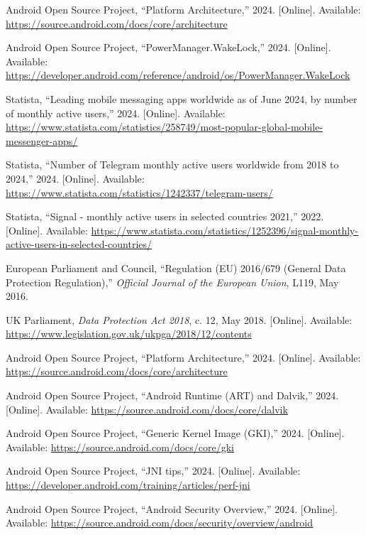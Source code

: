 \documentclass[a4paper,12pt]{report}
\begin{document}
\begin{thebibliography}{99}
Android Open Source Project, “Platform Architecture,” 2024. [Online]. Available: \url{https://source.android.com/docs/core/architecture}

Android Open Source Project, “PowerManager.WakeLock,” 2024. [Online]. Available: \url{https://developer.android.com/reference/android/os/PowerManager.WakeLock}

Statista, “Leading mobile messaging apps worldwide as of June 2024, by number of monthly active users,” 2024. [Online]. Available: \url{https://www.statista.com/statistics/258749/most-popular-global-mobile-messenger-apps/}

Statista, “Number of Telegram monthly active users worldwide from 2018 to 2024,” 2024. [Online]. Available: \url{https://www.statista.com/statistics/1242337/telegram-users/}

Statista, “Signal - monthly active users in selected countries 2021,” 2022. [Online]. Available: \url{https://www.statista.com/statistics/1252396/signal-monthly-active-users-in-selected-countries/}

European Parliament and Council, “Regulation (EU) 2016/679 (General Data Protection Regulation),” \emph{Official Journal of the European Union}, L119, May 2016.

UK Parliament, \emph{Data Protection Act 2018}, c. 12, May 2018. [Online]. Available: \url{https://www.legislation.gov.uk/ukpga/2018/12/contents}



Android Open Source Project, “Platform Architecture,” 2024. [Online]. Available: \url{https://source.android.com/docs/core/architecture}

Android Open Source Project, “Android Runtime (ART) and Dalvik,” 2024. [Online]. Available: \url{https://source.android.com/docs/core/dalvik}

Android Open Source Project, “Generic Kernel Image (GKI),” 2024. [Online]. Available: \url{https://source.android.com/docs/core/gki}

Android Open Source Project, “JNI tips,” 2024. [Online]. Available: \url{https://developer.android.com/training/articles/perf-jni}

Android Open Source Project, “Android Security Overview,” 2024. [Online]. Available: \url{https://source.android.com/docs/security/overview/android}


\end{thebibliography}
\end{document}
